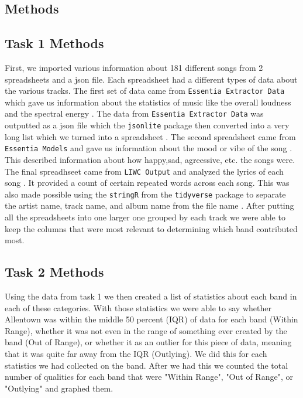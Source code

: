 \documentclass{article}\usepackage[]{graphicx}\usepackage[]{xcolor}
\begin{document}
\begin{multicols}{2}
\section{Methods}


\subsection{Task 1 Methods}

First, we imported various information about
181 different songs from 2 spreadsheets and a json file. Each spreadsheet had a different types of data about the various tracks. The first set of data came from \texttt{Essentia Extractor Data} which gave us information about the statistics of music like the overall loudness and the spectral energy \citep{bogdanov2013essentia}. The data from \texttt{Essentia Extractor Data} was outputted as a json file which the \texttt{jsonlite} package then converted into a very long list which we turned into a spreadsheet \citep{jsonlite}. The second spreadsheet came from \texttt{Essentia Models} and gave us information about the mood or vibe of the song \citep{9054688}. This described information about how happy,sad, agreessive, etc. the songs were. The final spreadhseet came from \texttt{LIWC Output} and analyzed the lyrics of each song \citep{boyd2022development}. It provided a count of certain repeated words across each song. This was also made possible using the \texttt{stringR} from the \texttt{tidyverse} package to separate the artist name, track name, and album name from the file name \citep{tidyverse}. After putting all the spreadsheets into one larger one grouped by each track we were able to keep the columns that were most relevant to determining which band contributed most. 

\subsection{Task 2 Methods}

Using the data from task 1 we then created a list of statistics about each band in each of these categories. With those statistics we were able to say whether Allentown was within the middle 50 percent (IQR) of data for each band (Within Range), whether it was not even in the range of something ever created by the band (Out of Range), or whether it as an outlier for this piece of data, meaning that it was quite far away from the IQR (Outlying). We did this for each statistics we had collected on the band. After we had this we counted the total number of qualities for each band that were "Within Range", "Out of Range", or "Outlying" and graphed them. 



\end{multicols}
\end{document}
